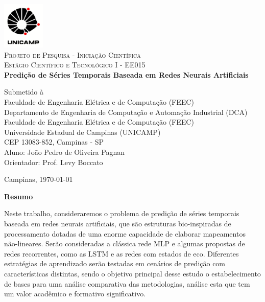\documentclass[a4paper, 12pt]{article}
\begin{document}
\begin{titlepage}
\newcommand{\HRule}{\rule{\linewidth}{1.5mm}}
	
\center

\includegraphics[width=0.15\textwidth]{logo-unicamp.pdf}\\[1.0cm]

\textsc{\Large Projeto de Pesquisa - Iniciação Científica}\\[0.5cm]

\textsc{\large Estágio Científico e Tecnológico I - EE015}\\[1.5cm]

{\Large \bfseries Predição de Séries Temporais Baseada em Redes Neurais Artificiais}\\[2.5cm]

\begin{flushleft}
Submetido à \\ Faculdade de Engenharia Elétrica e de Computação (FEEC)\\[1.5cm]

Departamento de Engenharia de Computação e Automação Industrial (DCA)\\
Faculdade de Engenharia Elétrica e de Computação (FEEC)\\
Universidade Estadual de Campinas (UNICAMP)\\
CEP 13083-852, Campinas - SP\\[1.0cm]

Aluno: João Pedro de Oliveira Pagnan\\
Orientador: Prof. Levy Boccato \\[4.5cm]
\end{flushleft}	
	
Campinas, \today

\end{titlepage}

\newpage

{\noindent \Large \textbf{Resumo}}

{\noindent Neste trabalho, consideraremos o problema de predição de séries temporais baseada em redes neurais artificiais, que são estruturas bio-inspiradas de processamento dotadas de uma enorme capacidade de elaborar mapeamentos não-lineares. Serão consideradas a clássica rede MLP e algumas propostas de redes recorrentes, como as LSTM e as redes com estados de eco. Diferentes estratégias de aprendizado serão testadas em cenários de predição com características distintas, sendo o objetivo principal desse estudo o estabelecimento de bases para uma análise comparativa das metodologias, análise esta que tem um valor acadêmico e formativo significativo.}
\end{document}
